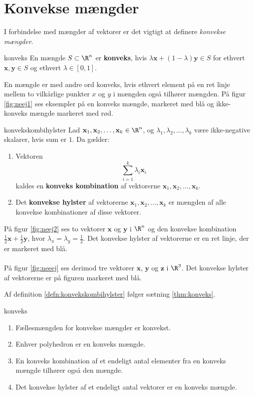 \section{Konvekse mængder}
%
I forbindelse med mængder af vektorer er det vigtigt at definere \textit{konvekse mængder}.
%
\begin{defn}{}{konveks}
En mængde $S \subset \R^n$ er \textbf{konveks}, hvis $\lambda \textbf{x} + (1- \lambda ) \textbf{y} \in S$ for ethvert $\textbf{x}, \textbf{y} \in S$ og ethvert $\lambda \in [0,1]$. 
\end{defn}
\noindent
%
En mængde er med andre ord konveks, hvis ethvert element på en ret linje mellem to vilkårlige punkter $x$ og $y$ i mængden også tilhører mængden. 
På figur \ref{fig:neej1} ses eksempler på en konveks mængde, markeret med blå og ikke-konveks mængde markeret med rød. 
%

%
\begin{defn}{}{konvekskombihylster}
Lad $\textbf{x}_1, \textbf{x}_2, \ldots, \textbf{x}_k \in \R^n$, og $\lambda_1, \lambda_2, \ldots, \lambda_k$ være ikke-negative skalarer, hvis sum er $1$. Da gælder:
%
\begin{enumerate}[label=(\alph*)]
	\item Vektoren $$\sum_{i=1}^{k} \lambda_i \textbf{x}_i$$ kaldes en \textbf{konveks kombination} af vektorerne $\textbf{x}_1, \textbf{x}_2, \ldots, \textbf{x}_k$. 
	\item Det \textbf{konvekse hylster} af vektorerne $\textbf{x}_1, \textbf{x}_2, \ldots, \textbf{x}_k$ er mængden af alle konvekse kombinationer af disse vektorer. 
\end{enumerate}
%
%
\end{defn}
%
På figur \ref{fig:neej2} ses to vektorer $\mathbf{x}$ og $\mathbf{y}$ i $\R^n$ og den konvekse kombination $\frac{1}{2} \mathbf{x}+\frac{1}{2} \mathbf{y}$, hvor $\lambda_x = \lambda_y = \frac{1}{2}$. 
Det konvekse hylster af vektorerne er en ret linje, der er markeret med blå. 
\\\\
%

%
På figur \ref{fig:neeej} ses derimod tre vektorer $\mathbf{x}$, $\mathbf{y}$ og $\mathbf{z}$ i $\R^3$. 
Det konvekse hylster af vektorerne er på figuren markeret med blå.
%

%
Af definition \ref{defn:konvekskombihylster} følger sætning \ref{thm:konveks}.
%
\begin{thm}{}{konveks}
\begin{enumerate}[label=(\alph*)]
	\item Fællesmængden for konvekse mængder er konvekst. 
	\item Enhver polyhedron er en konveks mængde.
	\item En konveks kombination af et endeligt antal elementer fra en konveks mængde tilhører også den mængde. 
	\item Det konvekse hylster af et endeligt antal vektorer er en konveks mængde. 
\end{enumerate}
\end{thm}
